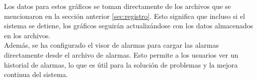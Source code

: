 
Los datos para estos gráficos se toman directamente de los archivos que se mencionaron en la sección anterior \ref{sec:registro}. Esto significa que incluso si el sistema se detiene, los gráficos seguirán actualizándose con los datos almacenados en los archivos.\\

Además, se ha configurado el visor de alarmas para cargar las alarmas directamente desde el archivo de alarmas. Esto permite a los usuarios ver un historial de alarmas, lo que es útil para la solución de problemas y la mejora continua del sistema.\\
